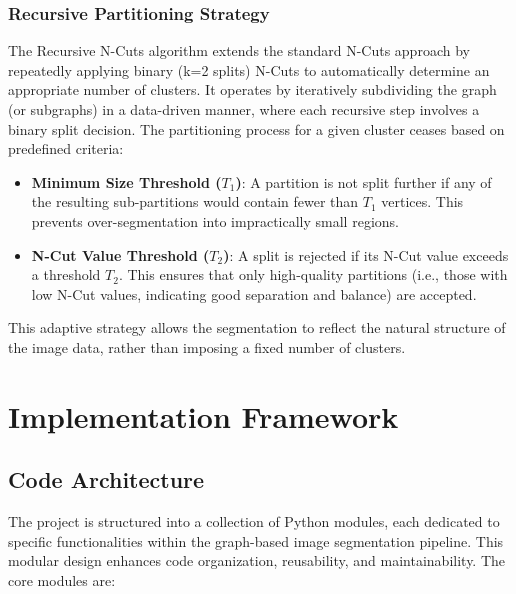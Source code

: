 \documentclass[12pt,a4paper]{article}
\begin{document}
\subsubsection{Recursive Partitioning Strategy}

The Recursive N-Cuts algorithm extends the standard N-Cuts approach by repeatedly applying binary (k=2 splits) N-Cuts to automatically determine an appropriate number of clusters. It operates by iteratively subdividing the graph (or subgraphs) in a data-driven manner, where each recursive step involves a binary split decision. The partitioning process for a given cluster ceases based on predefined criteria:

\begin{itemize}
    \item \textbf{Minimum Size Threshold ($T_1$)}: A partition is not split further if any of the resulting sub-partitions would contain fewer than $T_1$ vertices. This prevents over-segmentation into impractically small regions.
    \item \textbf{N-Cut Value Threshold ($T_2$)}: A split is rejected if its N-Cut value exceeds a threshold $T_2$. This ensures that only high-quality partitions (i.e., those with low N-Cut values, indicating good separation and balance) are accepted.
\end{itemize}
This adaptive strategy allows the segmentation to reflect the natural structure of the image data, rather than imposing a fixed number of clusters.





\section{Implementation Framework}

\subsection{Code Architecture}
The project is structured into a collection of Python modules, each dedicated to specific functionalities within the graph-based image segmentation pipeline. This modular design enhances code organization, reusability, and maintainability. The core modules are:
\end{document}
